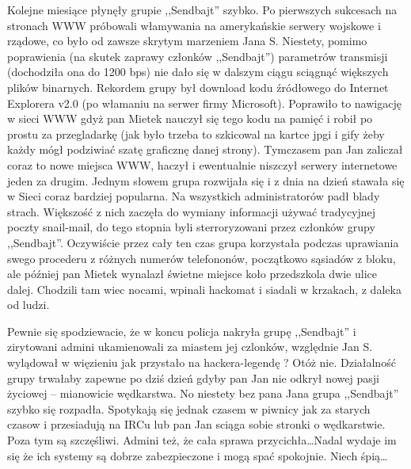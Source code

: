\documentclass[a4paper,polish,titlepage,12pt]{article}
\begin{document}
Kolejne miesiące płynęły grupie ,,Sendbajt'' szybko. Po pierwszych sukcesach na stronach WWW próbowali włamywania na amerykańskie serwery wojskowe i rządowe, co było od
zawsze skrytym marzeniem Jana S. Niestety, pomimo poprawienia (na skutek zaprawy członków ,,Sendbajt'') parametrów transmisji (dochodziła ona do 1200 bps) nie dało się w
dalszym ciągu sciągnąć większych plików binarnych. Rekordem grupy był download kodu źródłowego do Internet Explorera v2.0 (po włamaniu na serwer firmy Microsoft). Poprawiło
to nawigację w sieci WWW gdyż pan Mietek nauczył się tego kodu na pamięć i robił po prostu za przegladarkę (jak było trzeba to szkicowal na kartce jpgi i gify żeby każdy mógł
podziwiać szatę graficznę danej strony). Tymczasem pan Jan zaliczał coraz to nowe miejsca WWW, haczył i ewentualnie niszczył serwery internetowe jeden za drugim. Jednym
słowem grupa rozwijała się i z dnia na dzień stawała się w Sieci coraz bardziej popularna. Na wszystkich administratorów padł blady strach. Większość z nich zaczęła do
wymiany informacji używać tradycyjnej poczty snail-mail, do tego stopnia byli sterroryzowani przez członków grupy ,,Sendbajt''. Oczywiście przez cały ten czas grupa
korzystała podczas uprawiania swego procederu z różnych numerów telefononów, początkowo sąsiadów z bloku, ale później pan Mietek wynalazł świetne miejsce koło przedszkola
dwie ulice dalej. Chodzili tam wiec nocami, wpinali hackomat i siadali w krzakach, z daleka od ludzi.

Pewnie się spodziewacie, że w koncu policja nakryła grupę ,,Sendbajt'' i zirytowani admini ukamienowali za miastem jej czlonków, względnie Jan S. wylądował w więzieniu jak
przystało na hackera-legendę ? Otóż nie. Działalność grupy trwałaby zapewne po dziś dzień gdyby pan Jan nie odkrył nowej pasji życiowej -- mianowicie wędkarstwa. No niestety
bez pana Jana grupa ,,Sendbajt'' szybko się rozpadła. Spotykają się jednak czasem w piwnicy jak za starych czasow i przesiadują na IRCu lub pan Jan sciąga sobie stronki o
wędkarstwie. Poza tym są szczęśliwi. Admini też, że cała sprawa przycichła\dots Nadal wydaje im się że ich systemy są dobrze zabezpieczone i mogą spać spokojnie. Niech śpią\dots
\end{document}
